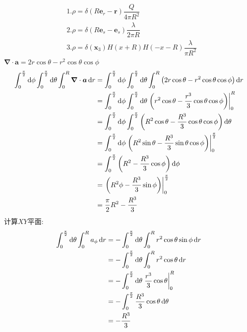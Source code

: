 \begin{align*}
&1.\rho =\delta(R\boldsymbol{e}_r-\boldsymbol{r})\dfrac{Q}{4\pi R^2}\\
&2.\rho=\delta(R\boldsymbol{e}_s-\boldsymbol{e}_s)\dfrac{\lambda}{2\pi R}\\
&3.\rho=\delta(\boldsymbol x_3)H(x+R)H(-x-R)\dfrac{\lambda}{\pi R^2}
\end{align*}
\begin{math}
    \boldsymbol{\nabla}\cdot \boldsymbol a=2r\cos\theta-r^2\cos\theta\cos\phi
\end{math}
\begin{align*}
    \int_{0}^{\frac{\pi}{2}}\dif \phi\int_{0}^{\frac{\pi}{2}}\dif \theta\int_{0}^{R}\boldsymbol{\nabla}\cdot \boldsymbol a\dif r
    &=\int_{0}^{\frac{\pi}{2}}\dif \phi\int_{0}^{\frac{\pi}{2}}\dif \theta\int_{0}^{R}\left(2r\cos\theta-r^2\cos\theta\cos\phi\right)\dif r\\
    &=\int_{0}^{\frac{\pi}{2}}\dif \phi\int_{0}^{\frac{\pi}{2}}\dif \theta\left.\left(r^2\cos\theta-\frac{r^3}{3}\cos\theta\cos\phi\right)\right|_0^R\\
    &=\int_{0}^{\frac{\pi}{2}}\dif \phi\int_{0}^{\frac{\pi}{2}}\left(R^2\cos\theta-\frac{R^3}{3}\cos\theta\cos\phi\right)\dif \theta\\
    &=\int_{0}^{\frac{\pi}{2}}\dif \phi\left.\left(R^2\sin\theta-\frac{R^3}{3}\sin\theta\cos\phi\right)\right|_0^{\frac{\pi}{2}}\\
    &=\int_{0}^{\frac{\pi}{2}}\left(R^2-\frac{R^3}{3}\cos\phi\right)\dif \phi\\
    &=\left.\left(R^2\phi-\frac{R^3}{3}\sin\phi\right)\right|_{0}^{\frac{\pi}{2}}\\
    &=\frac{\pi}{2}R^2-\frac{R^3}{3}
\end{align*}
计算$XY$平面:
\begin{align*}
    \int_{0}^{\frac{\pi}{2}}\dif \theta\int_{0}^{R}a_{\phi}\dif r
    &=-\int_{0}^{\frac{\pi}{2}}\dif \theta\int_{0}^{R}r^2\cos\theta\sin\phi\dif r\\
    &=-\int_{0}^{\frac{\pi}{2}}\dif \theta\int_{0}^{R}r^2\cos\theta\dif r\\
    &=-\int_{0}^{\frac{\pi}{2}}\dif \theta\left.\frac{r^3}{3}\cos\theta\right|_{0}^{R}\\
    &=-\int_{0}^{\frac{\pi}{2}}\frac{R^3}{3}\cos\theta\dif \theta\\
    &=-\frac{R^3}{3}
\end{align*}
